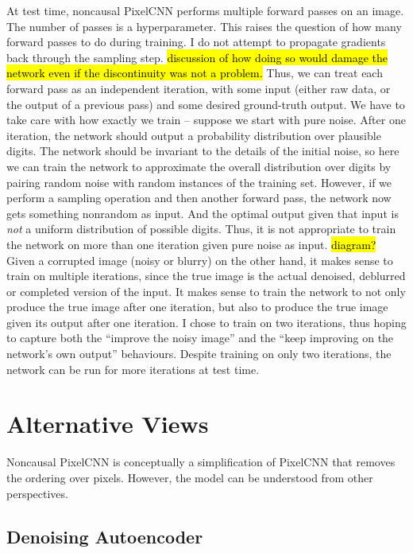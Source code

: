 \documentclass[10pt,a4paper]{article}
\newcommand{\nquote}[1]{``{#1}''}
\begin{document}
At test time, noncausal PixelCNN performs multiple forward passes on an image. The number of passes is a hyperparameter. This raises the question of how many forward passes to do during training. I do not attempt to propagate gradients back through the sampling step. \hl{discussion of how doing so would damage the network even if the discontinuity was not a problem.} Thus, we can treat each forward pass as an independent iteration, with some input (either raw data, or the output of a previous pass) and some desired ground-truth output. We have to take care with how exactly we train -- suppose we start with pure noise. After one iteration, the network should output a probability distribution over plausible digits. The network should be invariant to the details of the initial noise, so here we can train the network to approximate the overall distribution over digits by pairing random noise with random instances of the training set. However, if we perform a sampling operation and then another forward pass, the network now gets something nonrandom as input. And the optimal output given that input is \emph{not} a uniform distribution of possible digits. Thus, it is not appropriate to train the network on more than one iteration given pure noise as input. \hl{diagram?} Given a corrupted image (noisy or blurry) on the other hand, it makes sense to train on multiple iterations, since the true image is the actual denoised, deblurred or completed version of the input. It makes sense to train the network to not only produce the true image after one iteration, but also to produce the true image given its output after one iteration. I chose to train on two iterations, thus hoping to capture both the \nquote{improve the noisy image} and the \nquote{keep improving on the network's own output} behaviours. Despite training on only two iterations, the network can be run for more iterations at test time.
  
\section{Alternative Views}

Noncausal PixelCNN is conceptually a simplification of PixelCNN that removes the ordering over pixels. However, the model can be understood from other perspectives.

\subsection{Denoising Autoencoder}
\end{document}
